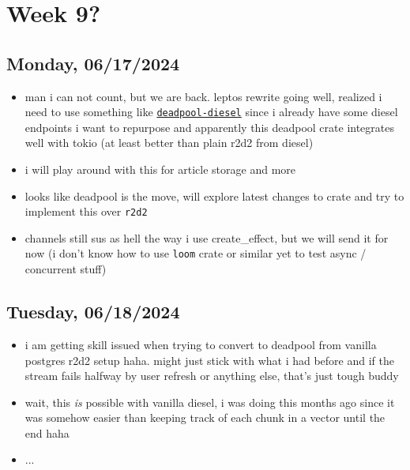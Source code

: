 \newpage
\section{Week 9?}
\subsection*{Monday, 06/17/2024}
\begin{itemize}
    \item man i can not count, but we are back. leptos rewrite going well,
        realized i need to use something like
        \texttt{\textcolor{blue}{\href{https://crates.io/crates/deadpool-diesel}{deadpool-diesel}}} since i
        already have some diesel endpoints i want to repurpose and apparently
        this deadpool crate integrates well with tokio (at least better than
        plain r2d2 from diesel)
    \item i will play around with this for article storage and more
    \item looks like deadpool is the move, will explore latest changes to crate
        and try to implement this over \texttt{r2d2}
    \item channels still sus as hell the way i use create_effect, but we will
        send it for now (i don't know how to use \texttt{loom} crate or similar yet to
        test async / concurrent stuff)
\end{itemize}

\subsection*{Tuesday, 06/18/2024}
\begin{itemize}
    \item i am getting skill issued when trying to convert to deadpool from
        vanilla postgres r2d2 setup haha. might just stick with what i had
        before and if the stream fails halfway by user refresh or anything else,
        that's just tough buddy\footnotemark
    \item wait, this \textit{is} possible with vanilla diesel, i was doing this 
        months ago since it was somehow easier than keeping track of each chunk 
        in a vector until the end haha
    \item ...
\end{itemize}

